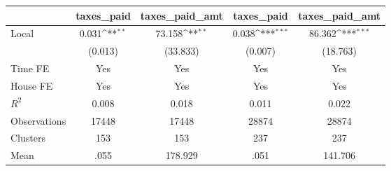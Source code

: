 {
\def\sym#1{\ifmmode^{#1}\else\(^{#1}\)\fi}
\begin{tabular}{l*{4}{c}}
\hline\hline
                &\multicolumn{1}{c}{taxes\_paid}&\multicolumn{1}{c}{taxes\_paid\_amt}&\multicolumn{1}{c}{taxes\_paid}&\multicolumn{1}{c}{taxes\_paid\_amt}\\
\hline
Local           &    0.031\sym{**} &   73.158\sym{**} &    0.038\sym{***}&   86.362\sym{***}\\
                &  (0.013)         & (33.833)         &  (0.007)         & (18.763)         \\
Time FE         &      Yes         &      Yes         &      Yes         &      Yes         \\
House FE        &      Yes         &      Yes         &      Yes         &      Yes         \\
\hline
\(R^{2}\)       &    0.008         &    0.018         &    0.011         &    0.022         \\
Observations    &    17448         &    17448         &    28874         &    28874         \\
Clusters        &      153         &      153         &      237         &      237         \\
Mean            &     .055         &  178.929         &     .051         &  141.706         \\
\hline\hline
\end{tabular}
}
